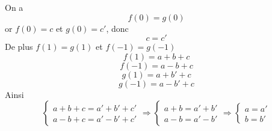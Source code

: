 \newline
\begin{preuve}
On a $$f(0) = g(0)$$
or $f(0) = c$ et $g(0) = c'$, donc $$c = c'$$
De plus $f(1) =g(1)$ et $f(-1) = g(-1)$
$$f(1) = a+b+c$$
$$f(-1) = a-b+c$$
$$g(1) = a+b'+c$$
$$g(-1) = a-b'+c$$
Ainsi 
$$\left\{
\begin{array}{l}
  a + b + c = a' + b' + c' \\
  a - b + c = a' - b' + c'
\end{array}
\right. \Rightarrow 
\left\{ \begin{array}{l}
  a + b = a' + b' \\
  a - b  = a' - b'
\end{array} \right. \Rightarrow \left\{ \begin{array}{l}
  a = a'\\
  b  =  b'
\end{array} \right. $$
\end{preuve}
